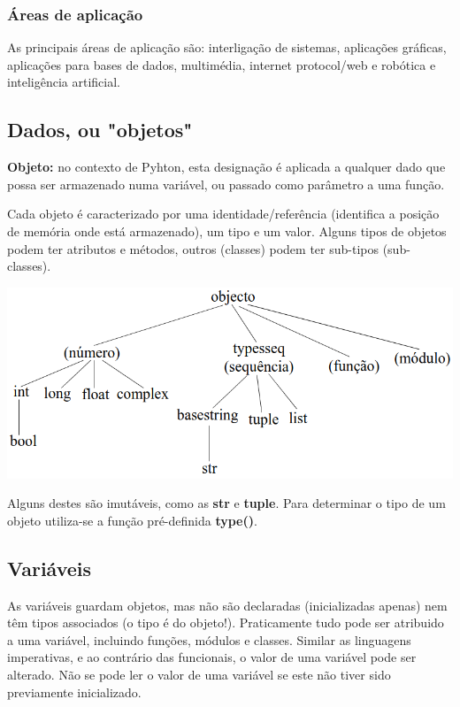 \documentclass{article}
\begin{document}
\subsubsection{Áreas de aplicação}

As principais áreas de aplicação são: interligação de sistemas, aplicações gráficas,
aplicações para bases de dados, multimédia, internet protocol/web e
robótica e inteligência artificial.

\subsection{Dados, ou "objetos"}

\begin{flushleft}
  \textbf{Objeto:} no contexto de Pyhton, esta designação é
  aplicada a qualquer dado que possa ser armazenado
  numa variável, ou passado como parâmetro a uma
  função.
\end{flushleft}

Cada objeto é caracterizado por uma identidade/referência (identifica a posição
de memória onde está armazenado), um tipo e um valor. Alguns tipos de
objetos podem ter atributos e métodos, outros (classes) podem ter
sub-tipos (sub-classes).

\begin{center}
  \includegraphics[scale=0.3]{3}
\end{center}

Alguns destes são imutáveis, como as \textbf{str} e \textbf{tuple}. Para determinar o tipo de um objeto utiliza-se a função pré-definida \textbf{type()}.

\pagebreak

\subsection{Variáveis}

As variáveis guardam objetos, mas não são declaradas (inicializadas apenas) nem têm tipos
associados (o tipo é do objeto!). Praticamente tudo pode ser atribuido a uma variável, incluindo
funções, módulos e classes. Similar as linguagens imperativas, e ao contrário das
funcionais, o valor de uma variável pode ser alterado. Não se pode ler o valor de uma variável
se este não tiver sido previamente inicializado.
\end{document}
